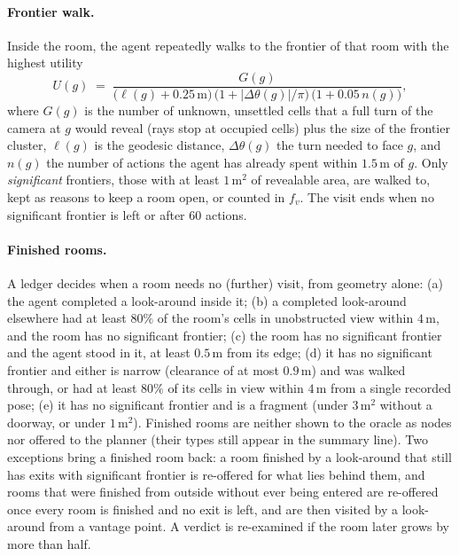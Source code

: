 \documentclass[10pt]{article}
\newcommand{\m}{\,\mathrm{m}}
\newcommand{\sqm}{\,\mathrm{m}^2}
\begin{document}
\paragraph{Frontier walk.} Inside the room, the agent repeatedly walks to the
frontier of that room with the highest utility
\begin{equation}\label{eq:viewgain}
  U(g) \;=\; \frac{G(g)}
  {\bigl(\ell(g)+0.25\m\bigr)\,\bigl(1+|\Delta\theta(g)|/\pi\bigr)\,
   \bigl(1+0.05\,n(g)\bigr)},
\end{equation}
where $G(g)$ is the number of unknown, unsettled cells that a full turn of the
camera at $g$ would reveal (rays stop at occupied cells) plus the size of the
frontier cluster, $\ell(g)$ is the geodesic distance, $\Delta\theta(g)$ the
turn needed to face $g$, and $n(g)$ the number of actions the agent has already
spent within $1.5\m$ of $g$. Only \emph{significant} frontiers, those with at
least $1\sqm$ of revealable area, are walked to, kept as reasons to keep a
room open, or counted in $f_v$. The visit ends when no significant frontier is
left or after $60$ actions.

\paragraph{Finished rooms.} A ledger decides when a room needs no (further)
visit, from geometry alone:
(a) the agent completed a look-around inside it;
(b) a completed look-around elsewhere had at least $80\%$ of the room's cells in
unobstructed view within $4\m$, and the room has no significant frontier;
(c) the room has no significant frontier and the agent stood in it, at least
$0.5\m$ from its edge;
(d) it has no significant frontier and either is narrow (clearance of at most
$0.9\m$) and was walked through, or had at least $80\%$ of its cells in view
within $4\m$ from a single recorded pose;
(e) it has no significant frontier and is a fragment (under $3\sqm$ without a
doorway, or under $1\sqm$).
Finished rooms are neither shown to the oracle as nodes nor offered to the
planner (their types still appear in the summary line). Two exceptions bring a
finished room back: a room finished by a look-around that still has exits with
significant frontier is re-offered for what lies behind them, and rooms that
were finished from outside without ever being entered are re-offered once
every room is finished and no exit is left, and are then visited by a
look-around from a vantage point. A verdict is re-examined if the
room later grows by more than half.
\end{document}
